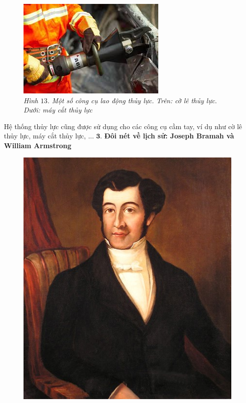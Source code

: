 \begin{multicols}{2}
\begin{figure}[H]
		\vspace*{4pt}
		\includegraphics[width= 1\linewidth]{25}
		\caption{\small\textit{\color{timhieukhoahoc}Hình $13$. Một số công cụ lao động thủy lực. Trên: cờ lê thủy lực. Dưới: máy cắt thủy lực}}
		\vspace*{-10pt}
	\end{figure}
	Hệ thống thủy lực cũng được sử dụng cho các công cụ cầm tay, ví dụ như cờ lê thủy lực, máy cắt thủy lực, ... 
	\vskip 0.1cm
	$\pmb{3.}$ \textbf{\color{timhieukhoahoc}Đôi nét về lịch sử: Joseph Bramah và William Armstrong}
	\begin{figure}[H]
		\vspace*{-5pt}
		\centering
		\captionsetup{labelformat= empty, justification=centering}
		\includegraphics[width= 1\linewidth]{26}

\end{figure}
\end{multicols}
